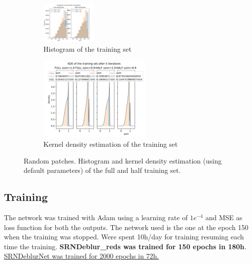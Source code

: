 \begin{enumerate}
\begin{figure}[H]
        \begin{subfigure}{\textwidth}
            \centering
            \includegraphics[width=0.3\textwidth,keepaspectratio]{subsections/srndeblur/histogram.pdf}
            \caption{Histogram of the training set}
        \end{subfigure}
        \begin{subfigure}{\textwidth}
            \centering
            \includegraphics[width=0.6\textwidth,keepaspectratio]{subsections/srndeblur/kde.pdf}
            \caption{Kernel density estimation of the training set}
            \label{kde_train}
        \end{subfigure}
        \caption{Random patches. Histogram and kernel density estimation (using default parameters) of the full and half training set.}
    \end{figure}
\end{enumerate}

\subsection{Training}
The network was trained with Adam\cite{adam} using a learning rate of $1e^{-4}$ and MSE as loss function for both the outputs.
The network used is the one at the epoch 150 when the training was stopped.
Were spent 10h/day for training resuming each time the training.
\textbf{SRNDeblur\_reds was trained for 150 epochs in 180h}. \underline{SRN\-DeblurNet\cite{SRN-DeblurNet} was trained for 2000 epochs in 72h.}

